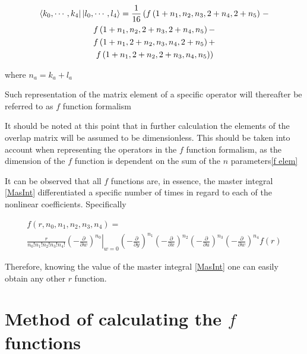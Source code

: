 \documentclass{pracalicmgr}
\begin{document}
\begin{multline}
    \bra{k_0,\cdots,k_4}\ket{l_0,\cdots,l_4} = \frac{1}{16}
    \left(
    f\left(1 + n_1,n_2,n_3,2 + n_4,2 + n_5\right)\right. -\\ 
    f\left(1 + n_1,n_2,2 + n_3,2 + n_4,n_5\right) - \\
    f\left(1 + n_1,2 + n_2,n_3,n_4,2 + n_5\right) + \\
    \left.f\left(1 + n_1,2 + n_2,2 + n_3,n_4,n_5\right)\right) \\
    \label{overlap}
\end{multline}

where $n_a = k_a + l_a$

Such representation of the matrix element of a specific operator will thereafter be referred to as $f$ function formalism

It should be noted at this point that in further calculation the elements of the overlap matrix will be assumed to be dimensionless. This should be taken into account when representing the operators in the $f$ function formalism, as the dimension of the $f$ function is dependent on the sum of the $n$ parameters\ref{f elem}

It can be observed that all $f$ functions are, in essence, the master integral \ref{MasInt} differentiated a specific number of times in regard to each of the nonlinear coefficients. Specifically

\begin{multline}
    f\left(r,n_0, n_1, n_2, n_3, n_4\right) = \\
    \frac{r}{n_0! n_1! n_2! n_3! n_4!} {\left.{\left(-\frac{\partial}{\partial w}\right)}^{n_0}\right|}_{w=0}{\left(-\frac{\partial}{\partial y}\right)}^{n_1} {\left(-\frac{\partial}{\partial x}\right)}^{n_2} {\left(-\frac{\partial}{\partial u}\right)}^{n_3}{\left(-\frac{\partial}{\partial w}\right)}^{n_4} f\left(r\right)
    \label{DeriDef}
\end{multline}

Therefore, knowing the value of the master integral \ref{MasInt} one can easily obtain any other $r$ function.

\section{Method of calculating the \texorpdfstring{$f$}{TEXT} functions}
\end{document}
